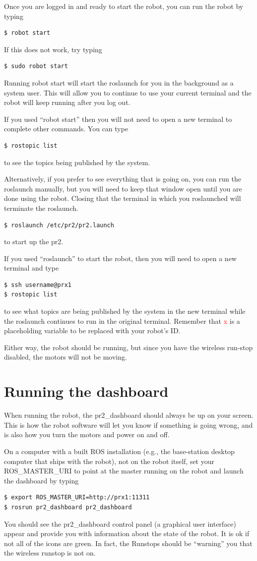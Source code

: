 Once you are logged in and ready to start the robot, you can run the robot by typing
\begin{verbatim}
$ robot start
\end{verbatim}
If this does not work, try typing
\begin{verbatim}
$ sudo robot start
\end{verbatim}
Running robot start will start the roslaunch for you in the background as a system user. This will 
allow you to continue to use your current terminal and the robot will keep running after you log out.  

If you used ``robot start'' then you will not need to open a new terminal to complete other commands. You can type 
\begin{verbatim}
$ rostopic list
\end{verbatim}
to see the topics being published by the system. 

Alternatively, if you prefer to see everything that is going on, you can run the roslaunch manually, but you will need to keep that 
window open until you are done using the robot. Closing that the terminal in which you roslaunched will terminate the 
roslaunch.
\begin{verbatim}
$ roslaunch /etc/pr2/pr2.launch
\end{verbatim}
to start up the pr2.  

If you used ``roslaunch'' to start the robot, then you will need to open a new terminal and type
\begin{verbatim}
$ ssh username@prx1
$ rostopic list
\end{verbatim}
to see what topics are being published by the system in the new terminal while the roslaunch continues to run in the 
original terminal. Remember that \textcolor{red}{x} is a placeholding variable to be replaced with your robot's ID.

Either way, the robot should be running, but since you have the wireless run-stop disabled, the motors will not be moving.  

\section{Running the dashboard}
When running the robot, the pr2\_dashboard should always be up on your screen.  This is how the robot software will 
let you know if something is going wrong, and is also how you turn the motors and power on and off.  

On a computer with a built ROS installation (e.g., the base-station desktop computer that ships with the robot), not on the robot itself, set your ROS\_MASTER\_URI to point at the master running on the robot and launch the dashboard by typing
\begin{verbatim}
$ export ROS_MASTER_URI=http://prx1:11311
$ rosrun pr2_dashboard pr2_dashboard
\end{verbatim}
You should see the pr2\_dashboard control panel (a graphical user interface) appear and provide you with information 
about the state of the robot. It is ok if not all of the icons are green. In fact, the Runstops should be ``warning'' you that the wireless runstop is not on. 



